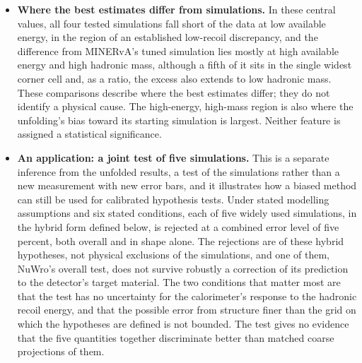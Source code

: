 \begin{itemize}
\item \textbf{Where the best estimates differ from simulations.} In these central values, all four tested simulations fall short of the data at low available energy, in the region of an established low-recoil discrepancy, and the difference from MINERvA's tuned simulation lies mostly at high available energy and high hadronic mass, although a fifth of it sits in the single widest corner cell and, as a ratio, the excess also extends to low hadronic mass. These comparisons describe where the best estimates differ; they do not identify a physical cause. The high-energy, high-mass region is also where the unfolding's bias toward its starting simulation is largest. Neither feature is assigned a statistical significance.
\item \textbf{An application: a joint test of five simulations.} This is a separate inference from the unfolded results, a test of the simulations rather than a new measurement with new error bars, and it illustrates how a biased method can still be used for calibrated hypothesis tests. Under stated modelling assumptions and six stated conditions, each of five widely used simulations, in the hybrid form defined below, is rejected at a combined error level of five percent, both overall and in shape alone. The rejections are of these hybrid hypotheses, not physical exclusions of the simulations, and one of them, NuWro's overall test, does not survive robustly a correction of its prediction to the detector's target material. The two conditions that matter most are that the test has no uncertainty for the calorimeter's response to the hadronic recoil energy, and that the possible error from structure finer than the grid on which the hypotheses are defined is not bounded. The test gives no evidence that the five quantities together discriminate better than matched coarse projections of them.

\end{itemize}
